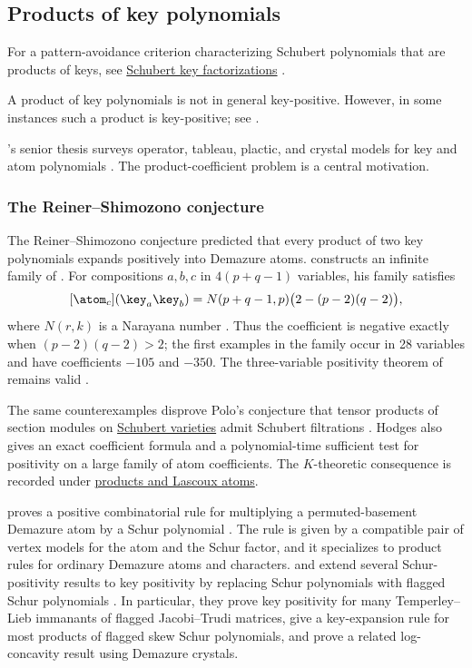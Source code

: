 \subsection[keyProduct]{Products of key polynomials}

For a pattern-avoidance criterion characterizing Schubert polynomials
that are products of keys, see
\hyperref[schubertKeyFactorization]{Schubert key factorizations}
\cite[Thm.~1.1]{HanMaSun2026x}.

A product of key polynomials is not in general key-positive.
However, in some instances such a product is key-positive; see \cite{Kouno2018}.

's senior thesis surveys operator,
tableau, plactic, and crystal models for key and atom polynomials
\cite{DantasEMoura2024Thesis}.  The product-coefficient problem is a central
motivation.

\subsubsection[reinerShimozonoConjecture]{The Reiner--Shimozono conjecture}

The Reiner--Shimozono conjecture predicted that every product of two key
polynomials expands positively into Demazure atoms.  
constructs an infinite family of
\label{reinerShimozonoCounterexamples}.  For compositions $a,b,c$ in
$4(p+q-1)$ variables, his family satisfies
\[
  [\atom_c](\key_a\key_b)
  =
  N(p+q-1,p)\bigl(2-(p-2)(q-2)\bigr),
\]
where $N(r,k)$ is a Narayana number \cite[Thm.~1.1]{Hodges2026x}.  Thus the
coefficient is negative exactly when $(p-2)(q-2)>2$; the first examples in
the family occur in 28 variables and have coefficients $-105$ and $-350$.
The three-variable positivity theorem of  remains valid
\cite{Pun2016Thesis}.

The same counterexamples disprove Polo's conjecture that tensor products of
section modules on \hyperref[schubertVarietyDefinition]{Schubert varieties}
admit Schubert filtrations
\cite[Cor.~1.2]{Hodges2026x}.  Hodges also gives an exact coefficient formula
and a polynomial-time sufficient test for positivity on a large family of
atom coefficients.  The $K$-theoretic consequence is recorded under
\hyperref[lascouxProductAtomCounterexamples]{products and Lascoux atoms}.

 proves a positive combinatorial rule for multiplying
a permuted-basement Demazure atom by a Schur polynomial
\cite{Miller2025x}.  The rule is given by a compatible pair of vertex models
for the atom and the Schur factor, and it specializes to product rules for
ordinary Demazure atoms and characters.
 and  extend several Schur-positivity
results to key positivity by replacing Schur polynomials with flagged Schur
polynomials \cite{PatenWoodruff2026x}.  In particular, they prove key
positivity for many Temperley--Lieb immanants of flagged Jacobi--Trudi
matrices, give a key-expansion rule for most products of flagged skew Schur
polynomials, and prove a related log-concavity result using Demazure crystals.



